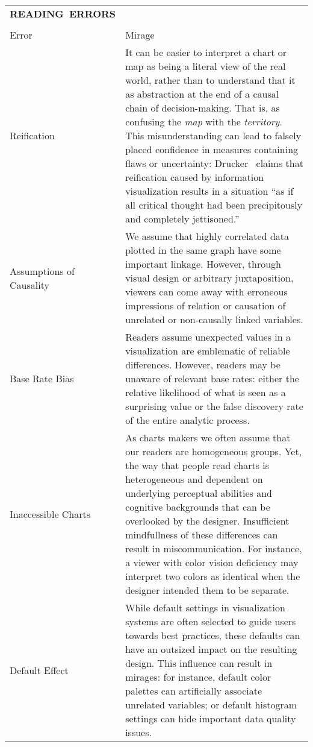 \begin{longtable}{>{\raggedright\arraybackslash}p{3cm}p{14cm}}
  \\\hbox{\normalsize{\textbf{READING ERRORS}}}&\\ \\
  \normalsize{Error} & \normalsize{Mirage}\\ \hline
   \rowcolor{colord}Reification  & It can be easier to interpret a chart or map as being a literal view of the real world, rather than to understand that it as abstraction at the end of a causal chain of decision-making. That is, as confusing the \emph{map} with the \emph{territory}. This misunderstanding can lead to falsely placed confidence in measures containing flaws or uncertainty: Drucker~\cite{drucker2012humanistic} claims that reification caused by information visualization results in a situation ``as if all critical thought had been precipitously and completely jettisoned.'' \cite{drucker2012humanistic}\\
 \rowcolor{colord-opaque}Assumptions of Causality  & We assume that highly correlated data plotted in the same graph have some important linkage. However, through visual design or arbitrary juxtaposition, viewers can come away with erroneous impressions of relation or causation of unrelated or non-causally linked variables. \cite{xiong2019illusion, few2019loom}\\
 \rowcolor{colord}Base Rate Bias  & Readers assume unexpected values in a visualization are emblematic of reliable differences. However, readers may be unaware of relevant base rates: either the relative likelihood of what is seen as a surprising value or the false discovery rate of the entire analytic process. \cite{correll2016surprise,pu2018garden, zgraggen2018investigating}\\
 \rowcolor{colord-opaque}Inaccessible Charts  & As charts makers we often assume that our readers are homogeneous groups. Yet, the way that people read charts is heterogeneous and dependent on underlying perceptual abilities and cognitive backgrounds that can be overlooked by the designer. Insufficient mindfullness of these differences can result in miscommunication. For instance, a viewer with color vision deficiency may interpret two colors as identical when the designer intended them to be separate. \cite{lundgard2019Sociotechnical, plaisant2005information}\\
 \rowcolor{colord}Default Effect  & While default settings in visualization systems are often selected to guide users towards best practices, these defaults can have an outsized impact on the resulting design. This influence can result in mirages: for instance, default color palettes can artificially associate unrelated variables; or default histogram settings can hide important data quality issues. \cite{correll2018looks,few2019loom, hullman2011visualization,shah2006policy}\\

\end{longtable}
